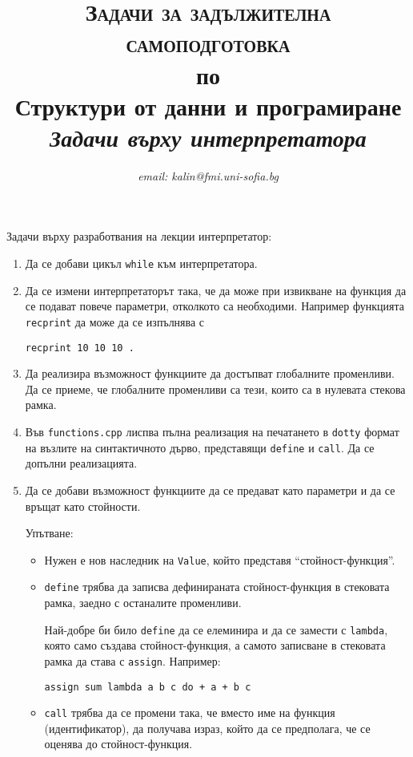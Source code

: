 \documentclass[12pt,a4paper]{article}
\author{\textit{email: kalin@fmi.uni-sofia.bg}}
\title{\textsc{Задачи за задължителна самоподготовка} \\
по \\
Структури от данни и програмиране\\
\textit{Задачи върху интерпретатора}}
\begin{document}
\maketitle

Задачи върху разработвания на лекции интерпретатор:

\begin{enumerate}

	\item Да се добави цикъл \texttt{while} към интерпретатора.

	\item Да се измени интерпретаторът така, че да може при извикване на функция да се подават повече параметри, отколкото са необходими. Например функцията \texttt{recprint} да може да се изпълнява с

	 \texttt{recprint 10 10 10 .}


	\item Да реализира възможност функциите да достъпват глобалните променливи. Да се приеме, че глобалните променливи са тези, които са в нулевата стекова рамка.

	\item Във \texttt{functions.cpp} лиспва пълна реализация на печатането в \texttt{dotty} формат на възлите на синтактичното дърво, представящи \texttt{define} и \texttt{call}. Да се допълни реализацията.

	\item Да се добави възможност функциите да се предават като параметри и да се връщат като стойности. 

	\begin{flushleft}
	Упътване: 
	\begin{itemize}
		\item Нужен е нов наследник на \texttt{Value}, който представя ``стойност-функция''. 
		\item \texttt{define} трябва да записва дефинираната стойност-функция в стековата рамка, заедно с останалите променливи. 

		Най-добре би било \texttt{define} да се елеминира и да се замести с \texttt{lambda}, която само създава стойност-функция, а самото записване в стековата рамка да става с \texttt{assign}. Например:

		\texttt{assign sum lambda a b c do + a + b c}


		\item \texttt{call} трябва да се промени така, че вместо име на функция (идентификатор), да получава израз, който да се предполага, че се оценява до стойност-функция. 
	\end{itemize}
		

\end{flushleft}
\end{enumerate}
\end{document}

